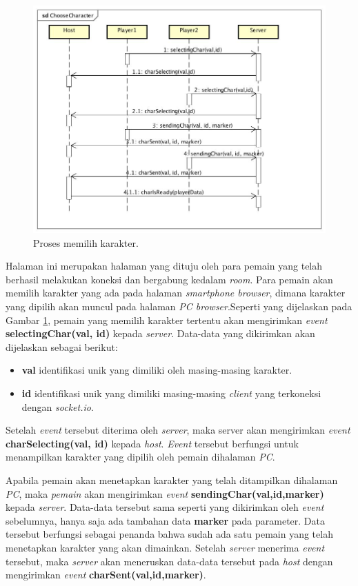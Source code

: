 \begin{figure}[H]
	\centering
	\includegraphics[scale=0.35]{Gambar/ChooseCharacter}
	\caption{Proses memilih karakter.}
	\label{fig:2_ChooseCharacter}
\end{figure}

Halaman ini merupakan halaman yang dituju oleh para pemain yang telah berhasil melakukan koneksi dan bergabung kedalam \textit{room}. Para pemain akan memilih karakter yang ada pada halaman \textit{smartphone browser}, dimana karakter yang dipilih akan muncul pada halaman \textit{PC browser}.Seperti yang dijelaskan pada Gambar \ref{fig:2_ChooseCharacter}, pemain yang memilih karakter tertentu akan mengirimkan \textit{event} \textbf{selectingChar(val, id)} kepada \textit{server}. Data-data yang dikirimkan akan dijelaskan sebagai berikut:
\begin{itemize}
	\item \textbf{val} identifikasi unik yang dimiliki oleh masing-masing karakter.
	\item \textbf{id} identifikasi unik yang dimiliki masing-masing \textit{client} yang terkoneksi dengan \textit{socket.io}.
\end{itemize}
Setelah \textit{event} tersebut diterima oleh \textit{server}, maka server akan mengirimkan \textit{event} \textbf{charSelecting(val, id)} kepada \textit{host}. \textit{Event} tersebut berfungsi untuk menampilkan karakter yang dipilih oleh pemain dihalaman \textit{PC}.

Apabila pemain akan menetapkan karakter yang telah ditampilkan dihalaman \textit{PC}, maka \textit{pemain} akan mengirimkan \textit{event} \textbf{sendingChar(val,id,marker)} kepada \textit{server}. Data-data tersebut sama seperti yang dikirimkan oleh \textit{event} sebelumnya, hanya saja ada tambahan data \textbf{marker} pada parameter. Data tersebut berfungsi sebagai penanda bahwa sudah ada satu pemain yang telah menetapkan karakter yang akan dimainkan. Setelah \textit{server} menerima \textit{event} tersebut, maka \textit{server} akan meneruskan data-data tersebut pada \textit{host} dengan mengirimkan \textit{event} \textbf{charSent(val,id,marker)}.

